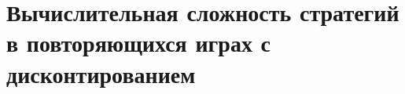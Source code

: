 \chapter{Вычислительная сложность стратегий в повторяющихся играх с дисконтированием}\label{ch:ch3}


%
%

